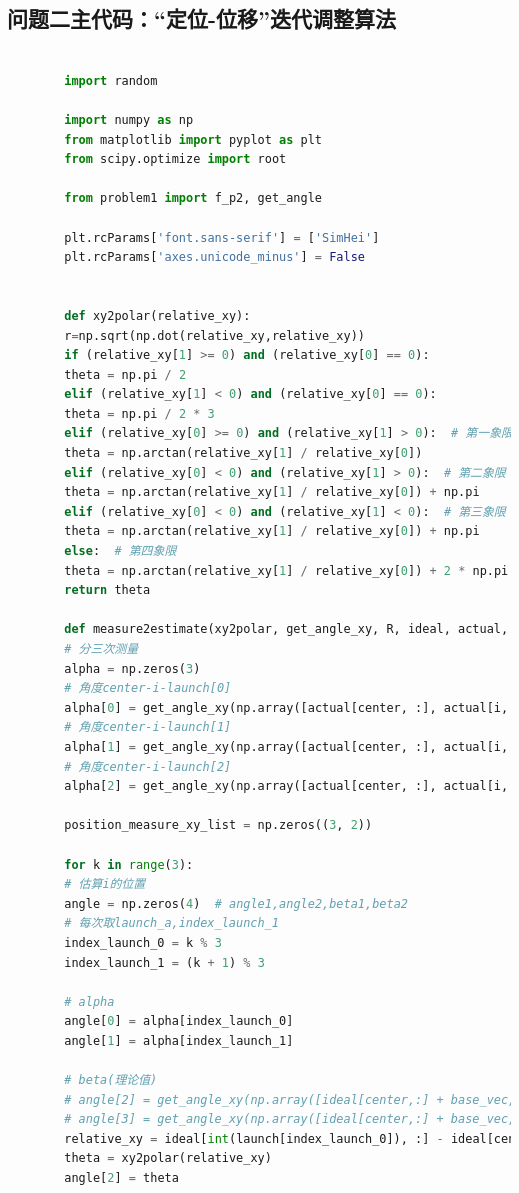 \documentclass[withoutpreface,bwprint]{cumcmthesis} %
\begin{document}
	\subsection{问题二主代码：“定位-位移”迭代调整算法}
	\begin{lstlisting}[language=python]
		
		import random
		
		import numpy as np
		from matplotlib import pyplot as plt
		from scipy.optimize import root
		
		from problem1 import f_p2, get_angle
		
		plt.rcParams['font.sans-serif'] = ['SimHei']
		plt.rcParams['axes.unicode_minus'] = False
		
		
		def xy2polar(relative_xy):
		r=np.sqrt(np.dot(relative_xy,relative_xy))
		if (relative_xy[1] >= 0) and (relative_xy[0] == 0):
		theta = np.pi / 2
		elif (relative_xy[1] < 0) and (relative_xy[0] == 0):
		theta = np.pi / 2 * 3
		elif (relative_xy[0] >= 0) and (relative_xy[1] > 0):  # 第一象限
		theta = np.arctan(relative_xy[1] / relative_xy[0])
		elif (relative_xy[0] < 0) and (relative_xy[1] > 0):  # 第二象限
		theta = np.arctan(relative_xy[1] / relative_xy[0]) + np.pi
		elif (relative_xy[0] < 0) and (relative_xy[1] < 0):  # 第三象限
		theta = np.arctan(relative_xy[1] / relative_xy[0]) + np.pi
		else:  # 第四象限
		theta = np.arctan(relative_xy[1] / relative_xy[0]) + 2 * np.pi
		return theta
		
		def measure2estimate(xy2polar, get_angle_xy, R, ideal, actual, i, position_hat, lr, launch, center):
		# 分三次测量
		alpha = np.zeros(3)
		# 角度center-i-launch[0]
		alpha[0] = get_angle_xy(np.array([actual[center, :], actual[i, :], actual[int(launch[0]), :]]))
		# 角度center-i-launch[1]
		alpha[1] = get_angle_xy(np.array([actual[center, :], actual[i, :], actual[int(launch[1]), :]]))
		# 角度center-i-launch[2]
		alpha[2] = get_angle_xy(np.array([actual[center, :], actual[i, :], actual[int(launch[2]), :]]))
		
		position_measure_xy_list = np.zeros((3, 2))
		
		for k in range(3):
		# 估算i的位置
		angle = np.zeros(4)  # angle1,angle2,beta1,beta2
		# 每次取launch_a,index_launch_1
		index_launch_0 = k % 3
		index_launch_1 = (k + 1) % 3
		
		# alpha
		angle[0] = alpha[index_launch_0]
		angle[1] = alpha[index_launch_1]
		
		# beta(理论值)
		# angle[2] = get_angle_xy(np.array([ideal[center,:] + base_vec, ideal[center,:], ideal[int(launch[index_launch_0]),:]]))
		# angle[3] = get_angle_xy(np.array([ideal[center,:] + base_vec, ideal[center,:], ideal[int(launch[index_launch_1]),:]]))
		relative_xy = ideal[int(launch[index_launch_0]), :] - ideal[center, :]
		theta = xy2polar(relative_xy)
		angle[2] = theta
		

\end{lstlisting}
\end{document}
